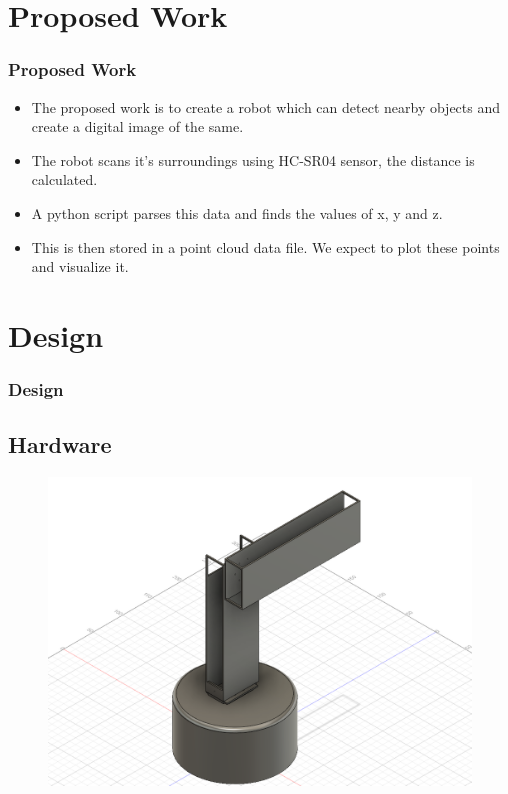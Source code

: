 \documentclass{beamer}
\begin{document}
\section{Proposed Work}
\begin{frame}
\frametitle{Proposed Work}
\begin{itemize}
\item The proposed work is to create a robot which can detect nearby objects and create a digital image of the same. 
\item The robot scans it's surroundings using HC-SR04 sensor, the distance is calculated.
\item A python script parses this data and finds the values of x, y and z.
\item This is then stored in a point cloud data file. We expect to plot these points and visualize it. 
\end{itemize}
\end{frame}

\section{Design}
\begin{frame}
\frametitle{Design}
\subsection{Hardware}
\begin{figure}
\includegraphics[scale=0.25]{hardware.png}

\end{figure}

\end{frame}
\end{document}

